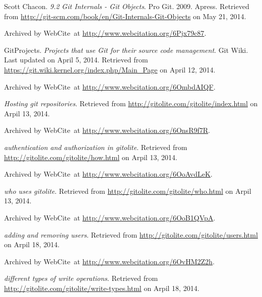 \begin{thebibliography}{9}

Scott Chacon. \emph{9.2 Git Internals - Git Objects}. Pro Git. 2009. Apress.
Retrieved from \url{http://git-scm.com/book/en/Git-Internals-Git-Objects} on
May 21, 2014.

Archived by WebCite\textsuperscript{\textregistered}\ at
\url{http://www.webcitation.org/6Pjx79c87}.


GitProjects. \emph{Projects that use Git for their source code management}. Git
Wiki. Last updated on April 5, 2014. Retrieved from
\url{https://git.wiki.kernel.org/index.php/Main_Page} on April 12, 2014.

Archived by WebCite\textsuperscript{\textregistered}\ at
\url{http://www.webcitation.org/6OmbdAIQF}.


\emph{Hosting git repositories}. Retrieved from
\url{http://gitolite.com/gitolite/index.html} on Arpil 13, 2014.

Archived by WebCite\textsuperscript{\textregistered}\ at
\url{http://www.webcitation.org/6OnsR9f7R}.


\emph{authentication and authorization in gitolite}. Retrieved from
\url{http://gitolite.com/gitolite/how.html} on Arpil 13, 2014.

Archived by WebCite\textsuperscript{\textregistered}\ at
\url{http://www.webcitation.org/6OoAvdLeK}.


\emph{who uses gitolite}. Retrieved from
\url{http://gitolite.com/gitolite/who.html} on Arpil 13, 2014.

Archived by WebCite\textsuperscript{\textregistered}\ at
\url{http://www.webcitation.org/6OoB1QVpA}.


\emph{adding and removing users}. Retrieved from
\url{http://gitolite.com/gitolite/users.html} on Arpil 18, 2014.

Archived by WebCite\textsuperscript{\textregistered}\ at
\url{http://www.webcitation.org/6OvHM2Z2h}.


\emph{different types of write operations}. Retrieved from
\url{http://gitolite.com/gitolite/write-types.html} on Arpil 18, 2014.


\end{thebibliography}
